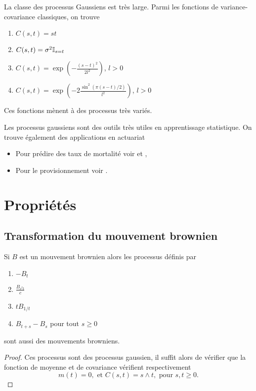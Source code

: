 La classe des processus Gaussiens est très large. Parmi les fonctions de variance-covariance classiques, on trouve 
\begin{enumerate}
  \item $C(s,t) = st$
  \item $C(s,t) = \sigma^2 \mathbb{I}_{s=t}$
  \item $C(s,t) = \exp\left(-\frac{(s-t)^2}{2l^2}\right)$, $l>0$
  \item $C(s,t) = \exp\left(-2\frac{\sin^2(\pi(s-t)/2)}{l^2}\right)$, $l>0$
\end{enumerate}
Ces fonctions mènent à des processus très variés.
\begin{remark}
Les processus gaussiens sont des outils très utiles en apprentissage statistique. On trouve également des applications en actuariat
\begin{itemize}
  \item Pour prédire des taux de mortalité voir \citet{Huynh2021} et \citet{Wu2018},
  \item Pour le provisionnement voir \citet{Ludkovski2022}.
\end{itemize}
\end{remark}
\section{Propriétés}
\subsection{Transformation du mouvement brownien}
\begin{prop}
Si $B$ est un mouvement brownien alors les processus définis par 
\begin{enumerate}
  \item $-B_t$
  \item $\frac{B_{c^2 t}}{c}$
  \item $t B_{1/t}$ 
  \item $B_{t+s}-B_s$ pour tout $s\geq 0$
\end{enumerate}
sont aussi des mouvements browniens.
\end{prop}
\begin{proof}
Ces processus sont des processus gaussien, il suffit alors de vérifier que la fonction de moyenne et de covariance vérifient respectivement
$$
m(t) = 0,\text{ et }C(s,t)=s\land t,\text{ pour }s,t\geq 0.
$$
\end{proof}
